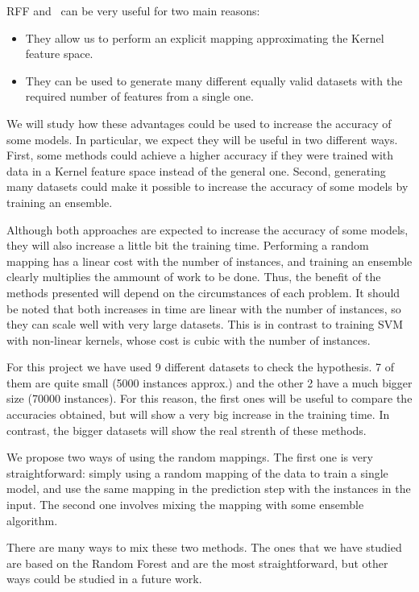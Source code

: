\begin{pre-delivery}
  RFF and \Nys\ can be very useful for two main reasons:
  \begin{itemize}
    \item They allow us to perform an explicit mapping approximating the Kernel
    feature space.
    \item They can be used to generate many different equally valid datasets
    with the required number of features from a single one.
  \end{itemize}

  We will study how these advantages could be used to increase the accuracy
  of some models. In particular, we expect they will be useful in two
  different ways. First, some methods could achieve a higher accuracy if they
  were trained with data in a Kernel feature space instead of the general
  one. Second, generating many datasets could make it possible to increase the
  accuracy of some models by training an ensemble.

  Although both approaches are expected to increase the accuracy of some
  models, they will also increase a little bit the training time. Performing
  a random mapping has a linear cost with the number of instances, and training
  an ensemble clearly multiplies the ammount of work to be done. Thus, the
  benefit of the methods presented will depend on the circumstances of
  each problem. It should be noted that both increases in time are linear with the
  number of instances, so they can scale well with very large datasets. This is
  in contrast to training SVM with non-linear kernels, whose cost is cubic
  with the number of instances.

  For this project we have used 9 different datasets to check the hypothesis. 7
  of them are quite small (5000 instances approx.) and the other 2 have a much
  bigger size (70000 instances). For this reason, the first ones will be useful
  to compare the accuracies obtained, but will show a very big increase in the
  training time. In contrast, the bigger datasets will show the real strenth
  of these methods.

  We propose two ways of using the random mappings. The first one is very
  straightforward: simply using a random mapping of the data to train a
  single model, and use the same mapping in the prediction step with
  the instances in the input. The second one involves mixing the mapping
  with some ensemble algorithm.

  There are many ways to mix these two methods. The ones that we have studied
  are based on the Random Forest and are the most straightforward, but other
  ways could be studied in a future work.


\end{pre-delivery}
